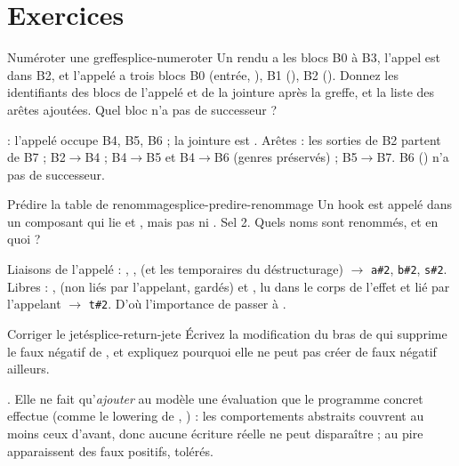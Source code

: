 \section*{Exercices}

\begin{exercice}{Numéroter une greffe}{splice-numeroter}
Un rendu a les blocs B0 à B3, l'appel est dans B2, et l'appelé a trois blocs B0 (entrée, ), B1 (), B2 (). Donnez les identifiants des blocs de l'appelé et de la jointure après la greffe, et la liste des arêtes ajoutées. Quel bloc n'a pas de successeur ?
\end{exercice}
\begin{solution}
 : l'appelé occupe B4, B5, B6 ; la jointure est . Arêtes : les sorties de B2 partent de B7 ; B2$\to$B4 ; B4$\to$B5 et B4$\to$B6 (genres préservés) ; B5$\to$B7. B6 () n'a pas de successeur.
\end{solution}

\begin{exercice}{Prédire la table de renommage}{splice-predire-renommage}
Un hook  est appelé dans un composant qui lie  et , mais pas  ni . Sel 2. Quels noms sont renommés, et en quoi ?
\end{exercice}
\begin{solution}
Liaisons de l'appelé : , ,  (et les temporaires du déstructurage) $\to$ \texttt{a\#2}, \texttt{b\#2}, \texttt{s\#2}. Libres : ,  (non liés par l'appelant, gardés) et , lu dans le corps de l'effet et lié par l'appelant $\to$ \texttt{t\#2}. D'où l'importance de passer  à .
\end{solution}

\begin{exercice}{Corriger le \texorpdfstring{}{return} jeté}{splice-return-jete}
Écrivez la modification du bras  de  qui supprime le faux négatif de , et expliquez pourquoi elle ne peut pas créer de faux négatif ailleurs.
\end{exercice}
\begin{solution}
. Elle ne fait qu'\emph{ajouter} au modèle une évaluation que le programme concret effectue (comme le lowering de , ) : les comportements abstraits couvrent au moins ceux d'avant, donc aucune écriture réelle ne peut disparaître ; au pire apparaissent des faux positifs, tolérés.
\end{solution}

